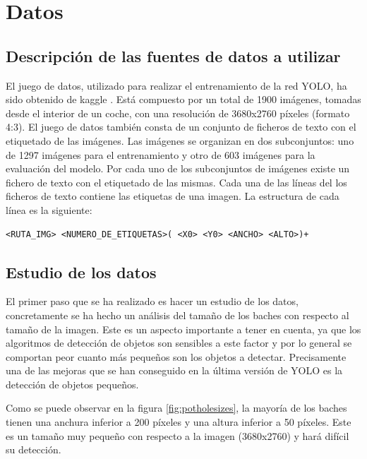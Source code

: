 \section{Datos}
\label{sec:datos}

\subsection{Descripción de las fuentes de datos a utilizar}

El juego de datos, utilizado para realizar el entrenamiento de la red YOLO, ha sido obtenido de kaggle \cite{s4_potholedataset}. Está compuesto por un total de 1900 imágenes, tomadas desde el interior de un coche, con una resolución de 3680x2760 píxeles (formato 4:3). El juego de datos también consta de un conjunto de ficheros de texto con el etiquetado de las imágenes. Las imágenes se organizan en dos subconjuntos: uno de 1297 imágenes para el entrenamiento y otro de 603 imágenes para la evaluación del modelo. Por cada uno de los subconjuntos de imágenes existe un fichero de texto con el etiquetado de las mismas. Cada una de las líneas del los ficheros de texto contiene las etiquetas de una imagen. La estructura de cada línea es la siguiente:

\begin{lstlisting}[frame=single,basicstyle=\ttfamily\footnotesize]
<RUTA_IMG> <NUMERO_DE_ETIQUETAS>( <X0> <Y0> <ANCHO> <ALTO>)+
\end{lstlisting}

\subsection{Estudio de los datos}

El primer paso que se ha realizado es hacer un estudio de los datos, concretamente se ha hecho un análisis del tamaño de los baches con respecto al tamaño de la imagen. Este es un aspecto importante a tener en cuenta, ya que los algoritmos de detección de objetos son sensibles a este factor y por lo general se comportan peor cuanto más pequeños son los objetos a detectar. Precisamente una de las mejoras que se han conseguido en la última versión de YOLO es la detección de objetos pequeños.

Como se puede observar en la figura \ref{fig:potholesizes}, la mayoría de los baches tienen una anchura inferior a 200 píxeles y una altura inferior a 50 píxeles. Este es un tamaño muy pequeño con respecto a la imagen (3680x2760) y hará difícil su detección.

